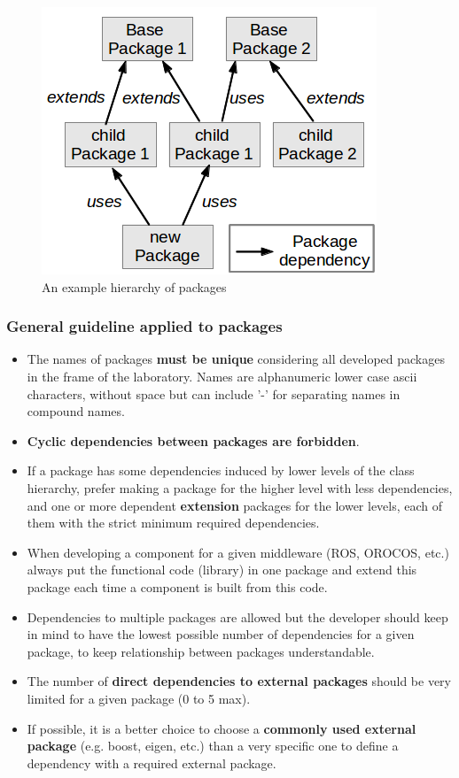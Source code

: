 \documentclass[12pt,a4paper]{article}
\begin{document}
\begin{figure}
\center
\includegraphics[scale=1]{images/package_hierarchy.png}
\caption{An example hierarchy of packages}
\label{fig:pack-hierarchy}
\end{figure}

\subsubsection{General guideline applied to packages}
\begin{itemize}
\item The names of packages \textbf{must be unique} considering all developed packages in the frame of the laboratory. Names are alphanumeric lower case ascii characters, without space but can include '-' for separating names in compound names.
\item \textbf{Cyclic dependencies between packages are forbidden}.
\item If a package has some dependencies induced by lower levels of the class hierarchy, prefer making a package for the higher level with less dependencies, and one or more dependent \textbf{extension} packages for the lower levels, each of them with the strict minimum required dependencies.
\item When developing a component for a given middleware (ROS, OROCOS, etc.) always put the functional code (library) in one package and extend this package each time a component is built from this code.
\item Dependencies to multiple packages are allowed but the developer should keep in mind to have the lowest possible number of dependencies for a given package, to keep relationship between packages understandable.
\item The number of \textbf{direct dependencies to external packages} should be very limited for a given package (0 to 5 max).
\item If possible, it is a better choice to choose a \textbf{commonly used external package} (e.g. boost, eigen, etc.) than a very specific one to define a dependency with a required external package.
\end{itemize}
\end{document}
